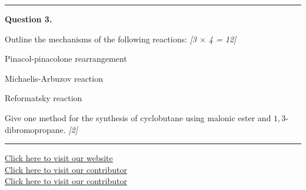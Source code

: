 \documentclass[11pt,a4paper]{article}
\newcommand{\pts}[1]{\hfill   \textit{[#1]}}
\begin{document}
\medskip\rule{\linewidth}{0.2pt}




\noindent   \textbf{Question 3.}

\begin{parts}
  \item Outline the mechanisms of the following reactions: \pts{3 $ \times$ 4 = 12}
  
\begin{parts}
    \item Pinacol-pinacolone rearrangement
    \item Michaelis-Arbuzov reaction
    \item Reformatsky reaction
  \end{parts}
  \item Give one method for the synthesis of cyclobutane using malonic ester and $1,3$-dibromopropane. \pts{2}
\end{parts}

\vfill
\rule{\linewidth}{0.4pt}

\begin{center}\small
  \href{https://bhu-exam.vercel.app/}{Click here to visit our website}\\[4pt]
  \href{https://me-aryan.vercel.app/}{Click here to visit our contributor}\\[4pt]
  \href{https://quashan-me.vercel.app/}{Click here to visit our contributor}
\end{center}
\end{document}
